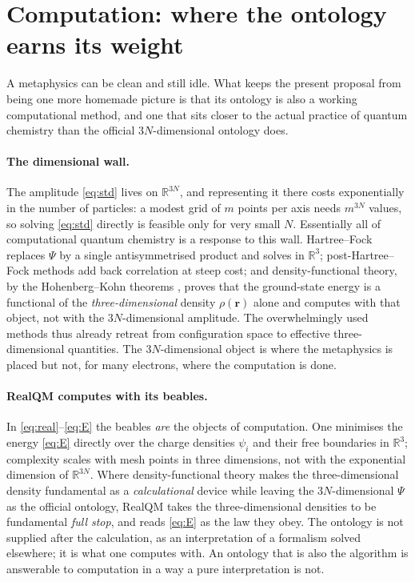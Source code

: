 \documentclass[11pt]{article}
\begin{document}
\section{Computation: where the ontology earns its weight}
\label{sec:comp}

A metaphysics can be clean and still idle. What keeps the present proposal from being one more homemade
picture is that its ontology is also a working computational method, and one that sits closer to the actual
practice of quantum chemistry than the official $3N$-dimensional ontology does.

\paragraph{The dimensional wall.} The amplitude \eqref{eq:std} lives on $\mathbb R^{3N}$, and representing
it there costs exponentially in the number of particles: a modest grid of $m$ points per axis needs
$m^{3N}$ values, so solving \eqref{eq:std} directly is feasible only for very small $N$. Essentially all of
computational quantum chemistry is a response to this wall. Hartree--Fock replaces $\Psi$ by a single
antisymmetrised product and solves in $\mathbb R^3$; post-Hartree--Fock methods add back correlation at
steep cost; and density-functional theory, by the Hohenberg--Kohn theorems \cite{HohenbergKohn1964,
KohnSham1965}, proves that the ground-state energy is a functional of the \emph{three-dimensional} density
$\rho(\mathbf r)$ alone and computes with that object, not with the $3N$-dimensional amplitude. The
overwhelmingly used methods thus already retreat from configuration space to effective three-dimensional
quantities. The $3N$-dimensional object is where the metaphysics is placed but not, for many electrons,
where the computation is done.

\paragraph{RealQM computes with its beables.} In \eqref{eq:real}--\eqref{eq:E} the beables \emph{are} the
objects of computation. One minimises the energy \eqref{eq:E} directly over the charge densities $\psi_i$
and their free boundaries in $\mathbb R^3$; complexity scales with mesh points in three dimensions, not
with the exponential dimension of $\mathbb R^{3N}$. Where density-functional theory makes the
three-dimensional density fundamental as a \emph{calculational} device while leaving the $3N$-dimensional
$\Psi$ as the official ontology, RealQM takes the three-dimensional densities to be fundamental \emph{full
stop}, and reads \eqref{eq:E} as the law they obey. The ontology is not supplied after the calculation, as
an interpretation of a formalism solved elsewhere; it is what one computes with. An ontology that is also
the algorithm is answerable to computation in a way a pure interpretation is not.
\end{document}

